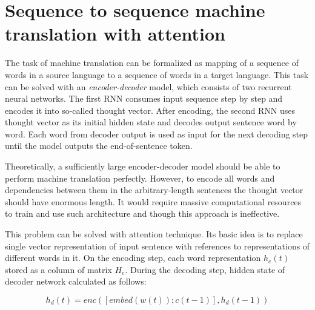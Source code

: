 \section{Sequence to sequence machine translation with attention}
The task of machine translation can be formalized as mapping of a sequence of words in a source language to a sequence of words in a target language. This task can be solved with an \emph{encoder-decoder} model, which consists of two recurrent neural networks. The first RNN consumes input sequence step by step and encodes it into so-called thought vector. After encoding, the second RNN uses thought vector as its initial hidden state and decodes output sentence word by word.  Each word from decoder output is used as input for the next decoding step until the model outputs the end-of-sentence token. 

Theoretically, a sufficiently large encoder-decoder model should be able to perform machine translation perfectly. However, to encode all words and dependencies between them in the arbitrary-length sentences the thought vector should have enormous length. It would require massive computational resources to train and use such architecture and though this approach is ineffective.

This problem can be solved with attention technique. Its basic idea is to replace single vector representation of input sentence with references to representations of different words in it. On the encoding step, each word representation $h_e(t)$ stored as a column of matrix $H_e$. During the decoding step, hidden state of decoder network calculated as follows:

\begin{equation}
h_d(t) = enc([embed(w(t));c(t-1)], h_d(t-1))
\label{attn:hd}
\end{equation}

